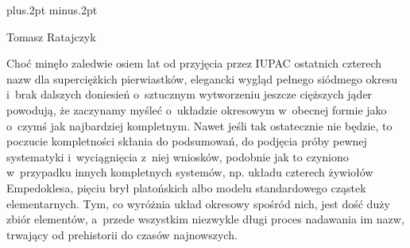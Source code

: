 \baselineskip12pt plus.2pt minus.2pt

{Tomasz Ratajczyk}





Choć minęło zaledwie osiem lat od przyjęcia przez IUPAC ostatnich
czterech nazw dla superciężkich pierwiastków, elegancki wygląd pełnego
siódmego okresu i~brak dalszych doniesień o~sztucznym wytworzeniu
jeszcze cięższych jąder powodują, że zaczynamy myśleć o~układzie
okresowym w~obecnej formie jako o~czymś jak najbardziej kompletnym.
Nawet jeśli tak ostatecznie nie będzie, to poczucie kompletności skłania
do podsumowań, do podjęcia próby pewnej systematyki i~wyciągnięcia z~niej wniosków, podobnie jak to czyniono w~przypadku innych kompletnych
systemów, np. układu czterech żywiołów Empedoklesa, pięciu brył
platońskich albo modelu standardowego cząstek elementarnych. Tym, co
wyróżnia układ okresowy spośród nich, jest dość duży zbiór elementów, a~przede wszystkim niezwykle długi proces nadawania im nazw, trwający od
prehistorii do czasów najnowszych.


